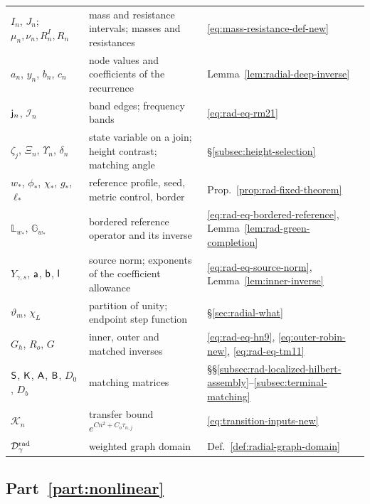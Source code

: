 \begin{longtable}{@{}p{.23\linewidth}p{.52\linewidth}p{.19\linewidth}@{}}
$I_n$, $J_n$; $\mu_n,\nu_n,R_n^I,R_n$ & mass and resistance
 intervals; masses and resistances & \eqref{eq:mass-resistance-def-new}\\
$a_n$, $y_n$, $b_n$, $c_n$ & node values and coefficients of the
 recurrence & Lemma~\ref{lem:radial-deep-inverse}\\
$\mathsf j_n$, $\mathcal I_n$ & band edges; frequency bands
 & \eqref{eq:rad-eq-rm21}\\
$\zeta_j$, $\Xi_n$, $\Upsilon_n$, $\delta_n$ & state variable on a
 join; height contrast; matching angle
 & \S\ref{subsec:height-selection}\\
$w_*$, $\phi_*$, $\chi_*$, $g_*$, $\ell_*$ & reference profile, seed,
 metric control, border & Prop.~\ref{prop:rad-fixed-theorem}\\
$\mathbb L_{w_*}$, $\mathbb G_{w_*}$ & bordered reference operator and
 its inverse & \eqref{eq:rad-eq-bordered-reference},
 Lemma~\ref{lem:rad-green-completion}\\
$Y_{\gamma,s}$, $\mathsf a$, $\mathsf b$, $\mathsf l$ & source norm; exponents of the
 coefficient allowance & \eqref{eq:rad-eq-source-norm},
 Lemma~\ref{lem:inner-inverse}\\
$\vartheta_m$, $\chi_L$ & partition of unity; endpoint step function
 & \S\ref{sec:radial-what}\\
$G_h$, $R_o$, $G$ & inner, outer and matched inverses
 & \eqref{eq:rad-eq-hn9}, \eqref{eq:outer-robin-new}, \eqref{eq:rad-eq-tm11}\\
$\mathsf S$, $\mathsf K$, $\mathsf A$, $\mathsf B$, $D_0$, $D_b$ & matching matrices
 & \S\S\ref{subsec:rad-localized-hilbert-assembly}--\ref{subsec:terminal-matching}\\
$\mathcal K_n$ & transfer bound $e^{Cn^2+C_o\tau_{n,j}}$
 & \eqref{eq:transition-inputs-new}\\
$\mathcal D^{\rm rad}_\gamma$ & weighted graph domain
 & Def.~\ref{def:radial-graph-domain}\\
\bottomrule
\end{longtable}

\subsection*{Part~\ref{part:nonlinear}}

